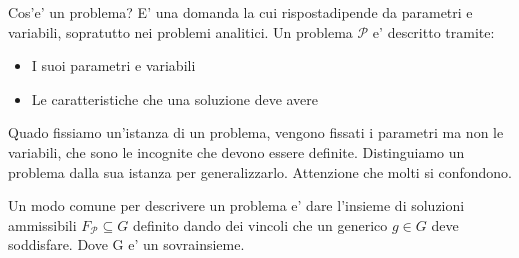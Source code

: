 \documentclass{report}
\begin{document}
Cos'e' un problema? E' una domanda la cui rispostadipende da parametri e variabili, sopratutto nei problemi analitici. Un problema $ \mathcal{P} $ e' descritto tramite:
\begin{itemize}
\item I suoi parametri e variabili
  \item Le caratteristiche che una soluzione deve avere
\end{itemize}

Quado fissiamo un'istanza di un problema, vengono fissati i parametri ma non le variabili, che sono le incognite che devono essere definite. Distinguiamo un problema dalla sua istanza per generalizzarlo. Attenzione che molti si confondono. 

Un modo comune per descrivere un problema e' dare l'insieme di soluzioni ammissibili $ F_{\mathcal{P}} \subseteq G $ definito dando dei vincoli che un generico $ g \in G $ deve soddisfare. Dove G e' un sovrainsieme.
\end{document}
